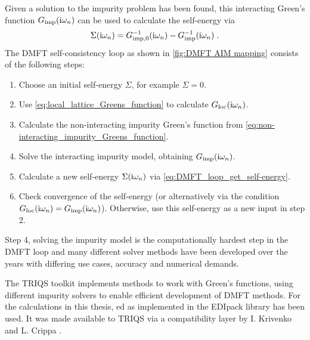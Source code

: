\documentclass[../main.tex]{subfiles}
\begin{document}
Given a solution to the impurity problem has been found, this interacting Green's function \(G_{\mathrm{imp}} (\mathrm{i} \omega_n)\) can be used to calculate the self-energy via
\begin{equation}
	\Sigma (\mathrm{i} \omega_n) = G_{\mathrm{imp},0}^{-1} (\mathrm{i} \omega_n) - G_{\mathrm{imp}}^{-1} (\mathrm{i} \omega_n) \;.
	\label{eq:DMFT_loop_get_self-energy}
\end{equation}
The DMFT self-consistency loop as shown in \cref{fig:DMFT AIM mapping} consists of the following steps:
\begin{enumerate}
	\item Choose an initial self-energy \(\Sigma\), for example \(\Sigma = 0\).
	\item Use \cref{eq:local_lattice_Greens_function} to calculate \(G_{\mathrm{loc}} (\mathrm{i} \omega_n)\).
	\item Calculate the non-interacting impurity Green's function from \cref{eq:non-interacting_impurity_Greens_function}.
	\item Solve the interacting impurity model, obtaining \(G_{\mathrm{imp}} (\mathrm{i} \omega_n)\).
	\item Calculate a new self-energy \(\Sigma (\mathrm{i} \omega_n)\) via \cref{eq:DMFT_loop_get_self-energy}.
	\item Check convergence of the self-energy (or alternatively via the condition \(G_{\mathrm{loc}} (\mathrm{i} \omega_n) = G_{\mathrm{imp}} (\mathrm{i} \omega_n)\)). Otherwise, use this self-energy as a new input in step 2.
\end{enumerate}
Step 4, solving the impurity model is the computationally hardest step in the DMFT loop and many different solver methods have been developed over the years with differing use cases, accuracy and numerical demands.

The TRIQS toolkit \cite{parcolletTRIQSToolboxResearch2015} implements methods to work with Green's functions, using different impurity solvers to enable efficient development of DMFT methods.
For the calculations in this thesis, \gls{ed} as implemented in the EDIpack library \cite{amaricciEDIpackParallelExact2022} has been used.
It was made available to TRIQS via a compatibility layer by I. Krivenko and L. Crippa \cite{krivenkoKrivenkoEdipack2triqs2025}.
\end{document}
